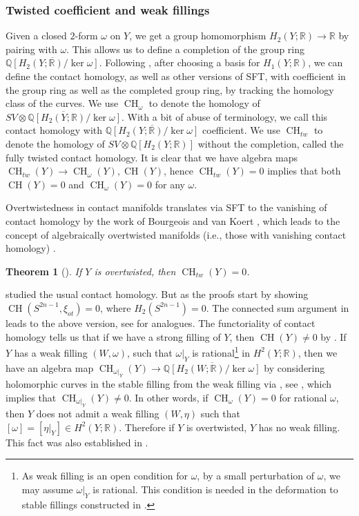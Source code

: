 \documentclass[11pt]{amsart}
\numberwithin{equation}{section}
\newtheorem{theorem}{\textbf{Theorem}}[section]
\def\R{\mathbb{R}}
\def\Q{{\mathbb Q}}
\DeclareMathOperator{\CH}{CH}
\begin{document}
\subsubsection{Twisted coefficient and weak fillings}\label{sss:twisted}
Given a closed $2$-form $\omega$ on $Y$, we get a group homomorphism $H_2(Y;\R)\to \R$ by pairing with $\omega$. This allows us to define a completion of the group ring $\overline{\Q[H_2(Y;\R)/\ker \omega]}$. Following \cite{zbMATH01643843,LW}, after choosing a basis for $H_1(Y;\R)$, we can define the contact homology, as well as other versions of SFT, with coefficient in the group ring as well as the completed group ring, by tracking the homology class of the curves. We use $\CH_{\omega}$ to denote the homology of $\overline{SV\otimes \Q[H_2(Y;\R)/\ker \omega]}$. With a bit of abuse of terminology, we call this contact homology with $\overline{\Q[H_2(Y;\R)/\ker \omega]}$ coefficient. We use $\CH_{tw}$ to denote the homology of $SV\otimes \Q[H_2(Y;\R)]$ without the completion, called the fully twisted contact homology. It is clear that we have algebra maps $\CH_{tw}(Y)\to \CH_{\omega}(Y),\CH(Y)$, hence $\CH_{tw}(Y)=0$ implies that both $\CH(Y)=0$ and $\CH_{\omega}(Y)=0$ for any $\omega$.


Overtwistedness in contact manifolds translates via SFT to the vanishing of contact homology by the work of Bourgeois and van Koert \cite{zbMATH05709738}, which leads to the concept of algebraically overtwisted manifolds (i.e., those with vanishing contact homology) \cite{zbMATH05658836}. 
\begin{theorem}[\cite{zbMATH05709738,+1}]\label{thm:AO}
    If $Y$ is overtwisted, then $\CH_{tw}(Y)=0$.
\end{theorem}
\cite{zbMATH05709738,+1} studied the usual contact homology. But as the proofs start by showing $\CH(S^{2n-1},
\xi_{ot})=0$, where $H_2(S^{2n-1})=0$. The connected sum argument in \cite{zbMATH05709738,+1} leads to the above version, see  for analogues. The functoriality of contact homology tells us that if we have a strong filling of $Y$, then $\CH(Y)\ne 0$ by . If $Y$ has a weak filling $(W,\omega)$, such that $\omega|_Y$ is rational\footnote{As weak filling is an open condition for $\omega$, by a small perturbation of $\omega$, we may assume $\omega|_Y$ is rational. This condition is needed in the deformation to stable fillings constructed in \cite[Proposition 6]{MNW}.} in $H^2(Y;\R)$, then we have an algebra map $\CH_{\omega|_Y}(Y)\to \overline{\Q[H_2(W;\R)/\ker \omega]}$ by considering holomorphic curves in the stable filling from the weak filling via \cite[Proposition 6]{MNW}, see \cite[Proposition 2.5 and discussions before it]{LW}, which implies that $\CH_{\omega|_Y}(Y)\ne 0$. In other words, if $\CH_{\omega}(Y)=0$ for rational $\omega$, then $Y$ does not admit a weak filling $(W,\eta)$ such that $[\omega]=[\eta|_{Y}] \in H^2(Y;\R)$. Therefore if $Y$ is overtwisted,  $Y$ has no weak filling. This fact was also established in \cite{schmaltz2023nonfillability}.  
\end{document}
